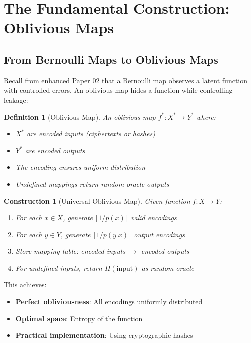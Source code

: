 \documentclass[11pt,final]{article}
\newtheorem{definition}[theorem]{Definition}
\newtheorem{construction}[theorem]{Construction}
\begin{document}
\section{The Fundamental Construction: Oblivious Maps}

\subsection{From Bernoulli Maps to Oblivious Maps}

Recall from enhanced Paper 02 that a Bernoulli map observes a latent function with controlled errors. An oblivious map hides a function while controlling leakage:

\begin{definition}[Oblivious Map]
An oblivious map $f^*: X^* \to Y^*$ where:
\begin{itemize}
\item $X^*$ are encoded inputs (ciphertexts or hashes)
\item $Y^*$ are encoded outputs
\item The encoding ensures uniform distribution
\item Undefined mappings return random oracle outputs
\end{itemize}
\end{definition}

\begin{construction}[Universal Oblivious Map]
Given function $f: X \to Y$:
\begin{enumerate}
\item For each $x \in X$, generate $\lceil 1/p(x) \rceil$ valid encodings
\item For each $y \in Y$, generate $\lceil 1/p(y|x) \rceil$ output encodings
\item Store mapping table: encoded inputs $\to$ encoded outputs
\item For undefined inputs, return $H(\text{input})$ as random oracle
\end{enumerate}
\end{construction}

This achieves:
\begin{itemize}
\item \textbf{Perfect obliviousness}: All encodings uniformly distributed
\item \textbf{Optimal space}: Entropy of the function
\item \textbf{Practical implementation}: Using cryptographic hashes
\end{itemize}
\end{document}
